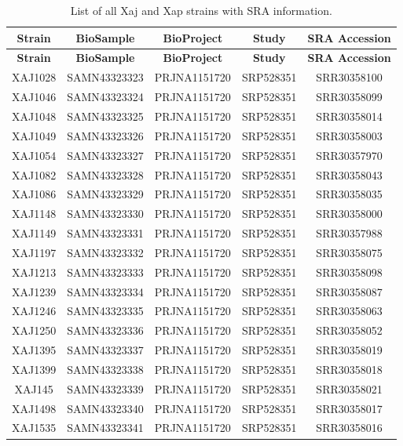 \documentclass[
]{book}
\begin{document}
\begin{longtable}[]{@{}ccccc@{}}
\caption{\label{tab:SRA} List of all Xaj and Xap strains with SRA information.}\tabularnewline
\toprule\noalign{}
\textbf{Strain} & \textbf{BioSample} & \textbf{BioProject} & \textbf{Study} & \textbf{SRA Accession} \\
\midrule\noalign{}
\endfirsthead
\toprule\noalign{}
\textbf{Strain} & \textbf{BioSample} & \textbf{BioProject} & \textbf{Study} & \textbf{SRA Accession} \\
\midrule\noalign{}
\endhead
\bottomrule\noalign{}
\endlastfoot
XAJ1028 & SAMN43323323 & PRJNA1151720 & SRP528351 & SRR30358100 \\
XAJ1046 & SAMN43323324 & PRJNA1151720 & SRP528351 & SRR30358099 \\
XAJ1048 & SAMN43323325 & PRJNA1151720 & SRP528351 & SRR30358014 \\
XAJ1049 & SAMN43323326 & PRJNA1151720 & SRP528351 & SRR30358003 \\
XAJ1054 & SAMN43323327 & PRJNA1151720 & SRP528351 & SRR30357970 \\
XAJ1082 & SAMN43323328 & PRJNA1151720 & SRP528351 & SRR30358043 \\
XAJ1086 & SAMN43323329 & PRJNA1151720 & SRP528351 & SRR30358035 \\
XAJ1148 & SAMN43323330 & PRJNA1151720 & SRP528351 & SRR30358000 \\
XAJ1149 & SAMN43323331 & PRJNA1151720 & SRP528351 & SRR30357988 \\
XAJ1197 & SAMN43323332 & PRJNA1151720 & SRP528351 & SRR30358075 \\
XAJ1213 & SAMN43323333 & PRJNA1151720 & SRP528351 & SRR30358098 \\
XAJ1239 & SAMN43323334 & PRJNA1151720 & SRP528351 & SRR30358087 \\
XAJ1246 & SAMN43323335 & PRJNA1151720 & SRP528351 & SRR30358063 \\
XAJ1250 & SAMN43323336 & PRJNA1151720 & SRP528351 & SRR30358052 \\
XAJ1395 & SAMN43323337 & PRJNA1151720 & SRP528351 & SRR30358019 \\
XAJ1399 & SAMN43323338 & PRJNA1151720 & SRP528351 & SRR30358018 \\
XAJ145 & SAMN43323339 & PRJNA1151720 & SRP528351 & SRR30358021 \\
XAJ1498 & SAMN43323340 & PRJNA1151720 & SRP528351 & SRR30358017 \\
XAJ1535 & SAMN43323341 & PRJNA1151720 & SRP528351 & SRR30358016 \\

\end{longtable}
\end{document}
